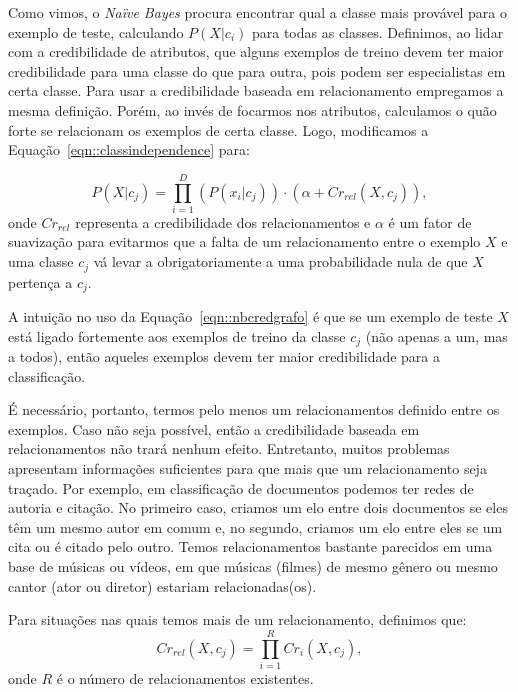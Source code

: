 Como vimos, o \textit{Naïve Bayes} procura encontrar qual a classe mais provável para o exemplo de teste, calculando $P(X|c_i)$ para todas as classes. Definimos, ao lidar com a credibilidade de atributos, que alguns exemplos de treino devem ter maior credibilidade para uma classe do que para outra, pois podem ser especialistas em certa classe. Para usar a credibilidade baseada em relacionamento empregamos a mesma definição. Porém, ao invés de focarmos nos atributos, calculamos o quão forte se relacionam os exemplos de certa classe. Logo, modificamos a Equação~\ref{eqn::classindependence} para:

\begin{equation}\label{eqn::nbcredgrafo}
P(X|c_{j}) = \prod^{D}_{i=1}{(P(x_i|c_j)) \cdot (\alpha + Cr_{rel}(X,c_j)) },
\end{equation}
onde $Cr_{rel}$ representa a credibilidade dos relacionamentos e $\alpha$ é um fator de suavização para evitarmos que a falta de um relacionamento entre o exemplo $X$ e uma classe $c_j$ vá levar a obrigatoriamente a uma probabilidade nula de que $X$ pertença a $c_j$.

A intuição no uso da Equação~\ref{eqn::nbcredgrafo} é que se um exemplo de teste $X$ está ligado fortemente aos exemplos de treino da classe $c_j$ (não apenas a um, mas a todos), então aqueles exemplos devem ter maior credibilidade para a classificação. %

É necessário, portanto, termos pelo menos um relacionamentos definido entre os exemplos. Caso não seja possível, então a credibilidade baseada em relacionamentos não trará nenhum efeito. Entretanto, muitos problemas apresentam informações suficientes para que mais que um relacionamento seja traçado. Por exemplo, em classificação de documentos podemos ter redes de autoria e citação.
No primeiro caso, criamos um elo entre dois documentos se eles têm um mesmo autor em comum e, no segundo, criamos um elo entre eles se um cita ou é citado pelo outro. 
Temos relacionamentos bastante parecidos em uma base de músicas ou vídeos, em que músicas (filmes) de mesmo gênero ou mesmo cantor (ator ou diretor) estariam relacionadas(os). 

Para situações nas quais temos mais de um relacionamento, definimos que:
\begin{equation}\label{eqn::nbcredgrafomulti}
Cr_{rel}(X, c_j) = \prod^{R}_{i=1} {Cr_{i}(X,c_j)},
\end{equation}
onde $R$ é o número de relacionamentos existentes. %

